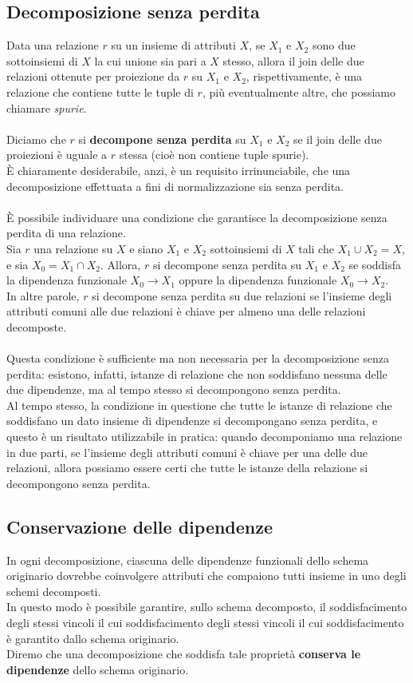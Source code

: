 \subsection{Decomposizione senza perdita}
Data una relazione $r$ su un insieme di attributi $X$, se $X_1$ e $X_2$ sono due sottoinsiemi di $X$ la cui unione sia pari a $X$ stesso, allora il join delle due relazioni ottenute per proiezione da $r$ su $X_1$ e $X_2$, rispettivamente, è una relazione che contiene tutte le tuple di $r$, più eventualmente altre, che possiamo chiamare \textit{spurie}.\\\\
Diciamo che $r$ si \textbf{decompone senza perdita} su $X_1$ e $X_2$ se il join delle due proiezioni è uguale a $r$ stessa (cioè non contiene tuple spurie).\\
È chiaramente desiderabile, anzi, è un requisito irrinunciabile, che una decomposizione effettuata a fini di normalizzazione sia senza perdita.\\\\
È possibile individuare una condizione che garantisce la decomposizione senza perdita di una relazione.\\ 
Sia $r$ una relazione su $X$ e siano $X_1$ e $X_2$ sottoinsiemi di $X$ tali che $X_1 \cup X_2 = X$, e sia $X_0 = X_1 \cap X_2$. Allora, $r$ si decompone senza perdita su $X_1$ e $X_2$ se soddisfa la dipendenza funzionale $X_0 \rightarrow X_1$ oppure la dipendenza funzionale $X_0 \rightarrow X_2$.\\
In altre parole, $r$ si decompone senza perdita su due relazioni se l'insieme degli attributi comuni alle due relazioni è chiave per almeno una delle relazioni decomposte.\\\\
Questa condizione è sufficiente ma non necessaria per la decomposizione senza perdita: esistono, infatti, istanze di relazione che non soddisfano nessuna delle due dipendenze, ma al tempo stesso si decompongono senza perdita.\\
Al tempo stesso, la condizione in questione che tutte le istanze di relazione che soddisfano un dato insieme di dipendenze si decompongano senza perdita, e questo è un risultato utilizzabile in pratica: quando decomponiamo una relazione in due parti, se l'insieme degli attributi comuni è chiave per una delle due relazioni, allora possiamo essere certi che tutte le istanze della relazione si decompongono senza perdita.

\subsection{Conservazione delle dipendenze}
In ogni decomposizione, ciascuna delle dipendenze funzionali dello schema originario dovrebbe coinvolgere attributi che compaiono tutti insieme in uno degli schemi decomposti.\\
In questo modo è possibile garantire, sullo schema decomposto, il soddisfacimento degli stessi vincoli il cui soddisfacimento degli stessi vincoli il cui soddisfacimento è garantito dallo schema originario.\\
Diremo che una decomposizione che soddisfa tale proprietà \textbf{conserva le dipendenze} dello schema originario.

